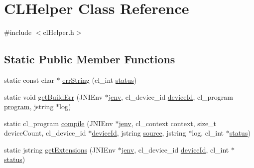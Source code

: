\hypertarget{class_c_l_helper}{\section{C\-L\-Helper Class Reference}
\label{class_c_l_helper}
}


{\ttfamily \#include $<$cl\-Helper.\-h$>$}

\subsection*{Static Public Member Functions}
\begin{DoxyCompactItemize}
\item 
static const char $\ast$ \hyperlink{class_c_l_helper_acdb10aebef4162371ac53e6fb6835c67}{err\-String} (cl\-\_\-int \hyperlink{aparapi_8cpp_a8d29973874cd2ac670823237b281069e}{status})
\item 
static void \hyperlink{class_c_l_helper_a701cbf42de8d2a5426cbee1d022f74ac}{get\-Build\-Err} (J\-N\-I\-Env $\ast$\hyperlink{aparapi_8cpp_a31595c73e9a3750524b2ff61b5a14f96}{jenv}, cl\-\_\-device\-\_\-id \hyperlink{opencljni_8cpp_aee8691126c8634ec30bfe4f704b3fd7a}{device\-Id}, cl\-\_\-program \hyperlink{aparapi_8cpp_ac70709e80332d58701f9623a803c8541}{program}, jstring $\ast$log)
\item 
static cl\-\_\-program \hyperlink{class_c_l_helper_a14600eb913779f2122461e3293c600dd}{compile} (J\-N\-I\-Env $\ast$\hyperlink{aparapi_8cpp_a31595c73e9a3750524b2ff61b5a14f96}{jenv}, cl\-\_\-context context, size\-\_\-t device\-Count, cl\-\_\-device\-\_\-id $\ast$\hyperlink{opencljni_8cpp_aee8691126c8634ec30bfe4f704b3fd7a}{device\-Id}, jstring \hyperlink{aparapi_8cpp_ab6f02de0fea282662dc1f6ac445ec5f3}{source}, jstring $\ast$log, cl\-\_\-int $\ast$\hyperlink{aparapi_8cpp_a8d29973874cd2ac670823237b281069e}{status})
\item 
static jstring \hyperlink{class_c_l_helper_a76a419374af4d200ee68c537d7c882e5}{get\-Extensions} (J\-N\-I\-Env $\ast$\hyperlink{aparapi_8cpp_a31595c73e9a3750524b2ff61b5a14f96}{jenv}, cl\-\_\-device\-\_\-id \hyperlink{opencljni_8cpp_aee8691126c8634ec30bfe4f704b3fd7a}{device\-Id}, cl\-\_\-int $\ast$\hyperlink{aparapi_8cpp_a8d29973874cd2ac670823237b281069e}{status})
\end{DoxyCompactItemize}


